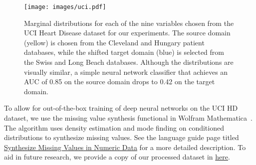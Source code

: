 \begin{figure}
    \centering
    \texttt{[image: images/uci.pdf]}
    \caption{Marginal distributions for each of the nine variables chosen from the UCI Heart Disease dataset for our experiments. The source domain (yellow) is chosen from the Cleveland and Hungary patient databases,
        while the shifted target domain (blue) is selected from the Swiss and Long Beach databases. Although the distributions are visually similar, a simple neural network classifier that achieves an AUC of 0.85 on the source domain drops to 0.42 on the target domain.}
    \label{fig:uci}
\end{figure}

To allow for out-of-the-box training of deep neural networks on the UCI HD dataset, we use the missing value synthesis functional in Wolfram Mathematica~\citep{Mathematica}.
The algorithm uses density estimation and mode finding on conditioned distributions to synthesize missing values.
See the language guide page titled \href{https://www.wolfram.com/language/12/high-level-machine-learning/synthesize-missing-values-in-numeric-data.html?product=language}{Synthesize Missing Values in Numeric Data} for a more detailed description.
To aid in future research, we provide a copy of our processed dataset in \href{https://github.com/tomginsberg/detectron/blob/main/data/uci_heart_torch.pt}{here}.